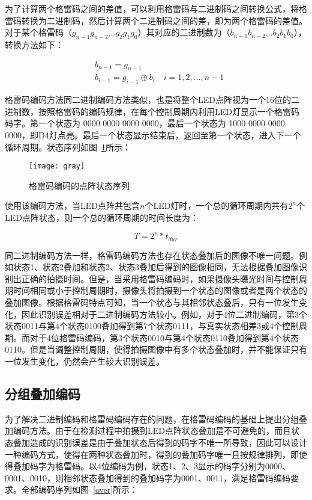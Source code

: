 为了计算两个格雷码之间的差值，可以利用格雷码与二进制码之间转换公式，将格雷码转换为二进制码，然后计算两个二进制码之间的差，即为两个格雷码的差值。对于某个格雷码（$g_{n-1}g_{n-2}...g_2g_1g_0$）其对应的二进制数为（$b_{n-1}b_{n-2}...b_2b_1b_0$），转换方法如下：

\begin{equation}
\begin{split}
&b_{n-1} = g_{n-1} \\
&b_{i-1} = g_{i-1} \oplus b_{i} \quad i = 1, 2, ..., n-1
\end{split}
\end{equation}

格雷码编码方法同二进制编码方法类似，也是将整个LED点阵视为一个16位的二进制数，按照格雷码的编码规律，在每个控制周期内利用LED灯显示一个格雷码码字。第一个状态为 0000 0000 0000 0000，最后一个状态为 1000 0000 0000 0000，即D4灯点亮。最后一个状态显示结束后，返回至第一个状态，进入下一个循环周期。状态序列如图~\ref{gray}所示：

\begin{figure}[h] 
  \centering
  \texttt{[image: gray]}
  \caption{格雷码编码的点阵状态序列}
  \label{gray}
\end{figure}

使用该编码方法，当LED点阵共包含$n$个LED灯时，一个总的循环周期内共有$2^n$个LED点阵状态，则一个总的循环周期的时间长度为：

\begin{equation}
T = 2^n * t_{dur}
\end{equation}

同二进制编码方法一样，格雷码编码方法也存在状态叠加后的图像不唯一问题。例如状态1、状态2叠加和状态2、状态3叠加后得到的图像相同，无法根据叠加图像识别出正确的拍摄时间。但是，当采用格雷码编码时，如果摄像头曝光时间与控制周期时间相同或小于控制周期时，摄像头将拍摄到一个状态的图像或者是两个状态的叠加图像。根据格雷码特点可知，当一个状态与其相邻状态叠后，只有一位发生变化，因此识别误差相对于二进制编码方法较小。例如，对于4位二进制编码，第3个状态0011与第4个状态0100叠加得到第7个状态0111，与真实状态相差3或4个控制周期。而对于4位格雷码编码，第3个状态0010与第4个状态0110叠加得到第4个状态0110。但是当调整控制周期，使得拍摄图像中有多个状态叠加时，并不能保证只有一位发生变化，仍然会产生较大识别误差。

\subsection{分组叠加编码}

为了解决二进制编码和格雷码编码存在的问题，在格雷码编码的基础上提出分组叠加编码方法。由于在检测过程中拍摄到LED点阵状态叠加是不可避免的，而且状态叠加造成的识别误差是由于叠加状态后得到的码字不唯一所导致，因此可以设计一种编码方式，使得在两种状态叠加时，得到的叠加码字唯一且按规律排列，即使得叠加码字为格雷码。以4位编码为例，状态1、2、3显示的码字分别为0000、0001、0010，则相邻状态叠加得到的叠加码字为0001、0011，满足格雷码编码要求。全部编码序列如图~\ref{over}所示：

